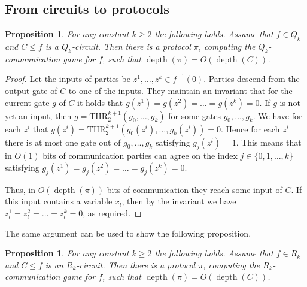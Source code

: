 \documentclass[11pt]{article}
\numberwithin{equation}{section}
\newtheorem{proposition}[theorem]{Proposition}
\theoremstyle{definition}
\theoremstyle{plain}
\def\THR{\mathrm{THR}}
\DeclareMathOperator{\depth}{depth}  %
\begin{document}
\subsection{From circuits to protocols} \label{subsec:circ_to_prot}
\begin{proposition}
\label{Q_k_to_protocols}
For any constant $k\ge 2$ the following holds.
Assume that $f\in Q_k$ and $C\le f$ is a $Q_k$-circuit. Then there is a protocol $\pi$, computing the $Q_k$-communication game for $f$, such that $\depth(\pi) =  O(\depth(C))$.
\end{proposition}
\begin{proof}
Let the inputs of parties be $z^1, \ldots, z^k\in f^{-1}(0)$.
Parties descend from the output gate of $C$ to one of the inputs. They maintain an invariant that for the current gate $g$ of $C$ it holds that $g(z^1) = g(z^2) = \ldots = g(z^k) = 0$. If $g$ is not yet an input, then $g = \THR^{k + 1}_2(g_0, \ldots, g_{k})$ for some gates $g_0, \ldots, g_{k}$. We have for each $z^i$ that $g(z^i) =  \THR^{k + 1}_2(g_0(z^i), \ldots, g_{k}(z^i)) = 0$. Hence for each $z^i$ there is at most one gate out of $g_0, \ldots, g_{k}$ satisfying $g_j(z^i) = 1$. This means that in $O(1)$ bits of communication parties can agree on the index $j\in \{0, 1, \ldots, k\}$ satisfying $g_j(z^1) = g_j(z^2) = \ldots = g_j(z^k) = 0$. 

Thus, in $O(\depth(\pi))$ bits of communication they reach some input of $C$. If this input contains a variable $x_l$, then by the invariant we have $z^1_l = z^2_l = \ldots = z_l^k = 0$, as required.
\end{proof}

The same argument can be used to show the following proposition.
\begin{proposition}
\label{R_k_to_protocols}
For any constant $k\ge 2$ the following holds.
Assume that $f\in R_k$ and $C\le f$ is an $R_k$-circuit. Then there is a protocol $\pi$, computing the $R_k$-communication game for $f$, such that $\depth(\pi) =  O(\depth(C))$.
\end{proposition}
\end{document}
